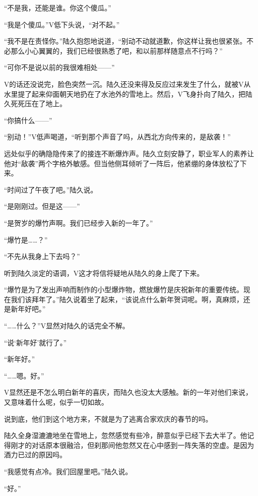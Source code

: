 “不是我，还能是谁。你这个傻瓜。”

“我是个傻瓜。”V低下头说，“对不起。”

“我不是在责怪你。”陆久抱怨地说道，“别动不动就道歉，你这样让我也很紧张。不必那么小心翼翼的，我们已经很熟悉了吧，和以前那样随意点不行吗？”

“可你不是说以前的我很难相处——”

V的话还没说完，脸色突然一沉。陆久还没来得及反应过来发生了什么，就被V从水里提了起来仰面朝天地扔在了水池外的雪地上。然后，V飞身扑向了陆久，把陆久死死压在了地上。

“你搞什么——”

“别动！”V低声喝道，“听到那个声音了吗，从西北方向传来的，是敌袭！”

远处似乎的确隐隐传来了的接连不断爆炸声。陆久立刻安静了，职业军人的素养让他对“敌袭”两个字格外敏感。但当他侧耳倾听了一阵后，他紧绷的身体放松了下来。

“时间过了午夜了吧。”陆久说。

“是刚刚过。但是这——”

“是贺岁的爆竹声啊。我们已经步入新的一年了。”

“爆竹是……？”

“不先从我身上下去吗？”

听到陆久淡定的语调，V这才将信将疑地从陆久的身上爬了下来。

“爆竹是为了发出声响而制作的小型爆炸物，燃放爆竹是庆祝新年的重要传统。现在我们该拜年了。”陆久说着坐了起来，“该说点什么新年贺词呢。啊，真麻烦，还是新年好吧。”

“……什么？”V显然对陆久的话完全不解。

“说‘新年好’就行了。”

“新年好。”

“……嗯。好。”

V显然还是不怎么明白新年的喜庆，而陆久也没太大感触。新的一年对他们来说，又意味着什么呢，似乎一切如故。

说到底，他们到这个地方来，不就是为了逃离合家欢庆的春节的吗。

陆久全身湿漉漉地坐在雪地上，忽然感觉有些冷，醉意似乎已经下去大半了。他记得刚才的对话原本很融洽，但刹那间他忽然又在心中感到一阵失落的空虚。是因为酒力已过的原因吗。

“我感觉有点冷。我们回屋里吧。”陆久说。

“好。”

\section*{}

